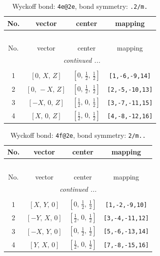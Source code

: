\documentclass[fleqn,8pt]{jsarticle}
\begin{document}
\renewcommand{\arraystretch}{1.2}
\begin{longtable}{cccc}
\caption{Wyckoff bond: {\tt 4e@2e}, bond symmetry: {\tt .2/m.}}
 \\
 \hline \hline
No. & vector & center & mapping \\ \hline \endfirsthead

\multicolumn{3}{l}{\tablename\ \thetable{}} \\
 \hline \hline
No. & vector & center & mapping \\ \hline \endhead

 \hline \hline
\multicolumn{3}{r}{\footnotesize\it continued ...} \\ \endfoot

 \hline \hline
\multicolumn{3}{r}{} \\ \endlastfoot

1 & $\left[ 0,\, X,\, Z \right]$ & $\left[ 0,\, \frac{1}{2},\, \frac{1}{2} \right]$ & {\tt [1,-6,-9,14]} \\ \hline
2 & $\left[ 0,\, - X,\, Z \right]$ & $\left[ 0,\, \frac{1}{2},\, \frac{1}{2} \right]$ & {\tt [2,-5,-10,13]} \\ \hline
3 & $\left[ - X,\, 0,\, Z \right]$ & $\left[ \frac{1}{2},\, 0,\, \frac{1}{2} \right]$ & {\tt [3,-7,-11,15]} \\ \hline
4 & $\left[ X,\, 0,\, Z \right]$ & $\left[ \frac{1}{2},\, 0,\, \frac{1}{2} \right]$ & {\tt [4,-8,-12,16]} \\
\end{longtable}
\renewcommand{\arraystretch}{1.2}
\begin{longtable}{cccc}
\caption{Wyckoff bond: {\tt 4f@2e}, bond symmetry: {\tt 2/m..}}
 \\
 \hline \hline
No. & vector & center & mapping \\ \hline \endfirsthead

\multicolumn{3}{l}{\tablename\ \thetable{}} \\
 \hline \hline
No. & vector & center & mapping \\ \hline \endhead

 \hline \hline
\multicolumn{3}{r}{\footnotesize\it continued ...} \\ \endfoot

 \hline \hline
\multicolumn{3}{r}{} \\ \endlastfoot

1 & $\left[ X,\, Y,\, 0 \right]$ & $\left[ 0,\, \frac{1}{2},\, \frac{1}{2} \right]$ & {\tt [1,-2,-9,10]} \\ \hline
2 & $\left[ - Y,\, X,\, 0 \right]$ & $\left[ \frac{1}{2},\, 0,\, \frac{1}{2} \right]$ & {\tt [3,-4,-11,12]} \\ \hline
3 & $\left[ - X,\, Y,\, 0 \right]$ & $\left[ 0,\, \frac{1}{2},\, \frac{1}{2} \right]$ & {\tt [5,-6,-13,14]} \\ \hline
4 & $\left[ Y,\, X,\, 0 \right]$ & $\left[ \frac{1}{2},\, 0,\, \frac{1}{2} \right]$ & {\tt [7,-8,-15,16]} \\
\end{longtable}
\end{document}
